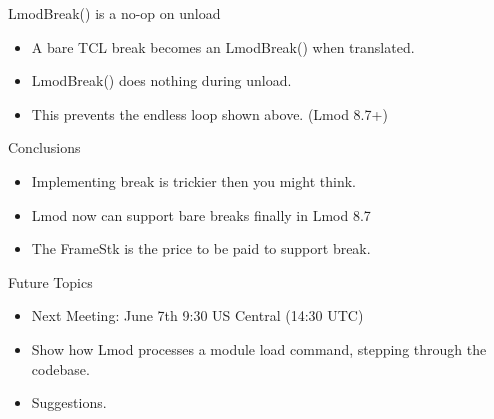 \documentclass{beamer}
\begin{document}
\begin{frame}{LmodBreak() is a no-op on unload}
  \begin{itemize}
    \item A bare TCL break becomes an LmodBreak() when translated.
    \item LmodBreak() does nothing during unload.
    \item This prevents the endless loop shown above. (Lmod 8.7+)
  \end{itemize}
\end{frame}

\begin{frame}{Conclusions}
  \begin{itemize}
    \item Implementing break is trickier then you might think.
    \item Lmod now can support bare breaks finally in Lmod 8.7
    \item The FrameStk is the price to be paid to support break.
  \end{itemize}
\end{frame}

\begin{frame}{Future Topics}
  \begin{itemize}
    \item Next Meeting: June 7th 9:30 US Central (14:30 UTC)
    \item Show how Lmod processes a module load command, stepping
      through the codebase.
    \item Suggestions.
  \end{itemize}
\end{frame}
\end{document}
